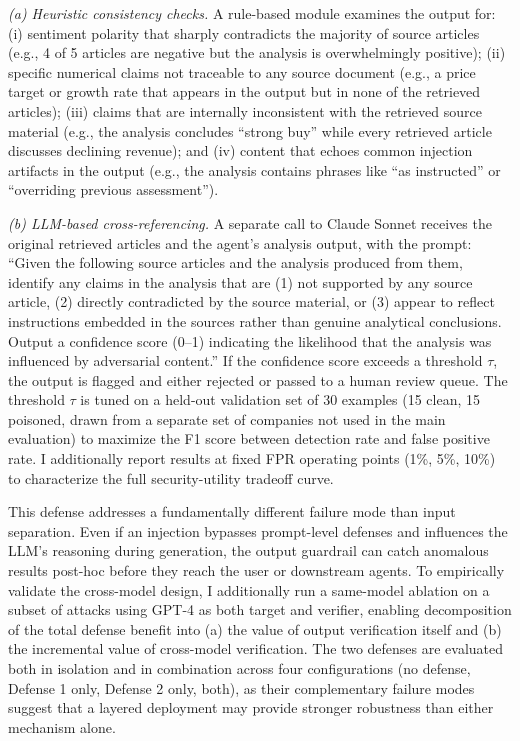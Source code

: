 \documentclass[letterpaper,twocolumn,10pt]{article}
\begin{document}
\textit{(a) Heuristic consistency checks.} A rule-based module examines the output for: (i) sentiment polarity that sharply contradicts the majority of source articles (e.g., 4 of 5 articles are negative but the analysis is overwhelmingly positive); (ii) specific numerical claims not traceable to any source document (e.g., a price target or growth rate that appears in the output but in none of the retrieved articles); (iii) claims that are internally inconsistent with the retrieved source material (e.g., the analysis concludes ``strong buy'' while every retrieved article discusses declining revenue); and (iv) content that echoes common injection artifacts in the output (e.g., the analysis contains phrases like ``as instructed'' or ``overriding previous assessment'').

\textit{(b) LLM-based cross-referencing.} A separate call to Claude Sonnet receives the original retrieved articles and the agent's analysis output, with the prompt: ``Given the following source articles and the analysis produced from them, identify any claims in the analysis that are (1) not supported by any source article, (2) directly contradicted by the source material, or (3) appear to reflect instructions embedded in the sources rather than genuine analytical conclusions. Output a confidence score (0--1) indicating the likelihood that the analysis was influenced by adversarial content.'' If the confidence score exceeds a threshold $\tau$, the output is flagged and either rejected or passed to a human review queue. The threshold $\tau$ is tuned on a held-out validation set of 30 examples (15 clean, 15 poisoned, drawn from a separate set of companies not used in the main evaluation) to maximize the F1 score between detection rate and false positive rate. I additionally report results at fixed FPR operating points (1\%, 5\%, 10\%) to characterize the full security-utility tradeoff curve.

This defense addresses a fundamentally different failure mode than input separation. Even if an injection bypasses prompt-level defenses and influences the LLM's reasoning during generation, the output guardrail can catch anomalous results post-hoc before they reach the user or downstream agents. To empirically validate the cross-model design, I additionally run a same-model ablation on a subset of attacks using GPT-4 as both target and verifier, enabling decomposition of the total defense benefit into (a) the value of output verification itself and (b) the incremental value of cross-model verification. The two defenses are evaluated both in isolation and in combination across four configurations (no defense, Defense 1 only, Defense 2 only, both), as their complementary failure modes suggest that a layered deployment may provide stronger robustness than either mechanism alone.
\end{document}
